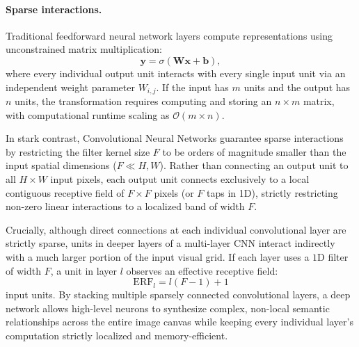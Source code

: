 \paragraph{Sparse interactions.}
Traditional feedforward neural network layers compute representations using unconstrained matrix multiplication:
\begin{equation}
\mathbf{y} = \sigma(\mathbf{W} \mathbf{x} + \mathbf{b}),
\end{equation}
where every individual output unit interacts with every single input unit via an independent weight parameter $W_{i, j}$. If the input has $m$ units and the output has $n$ units, the transformation requires computing and storing an $n \times m$ matrix, with computational runtime scaling as $\mathcal{O}(m \times n)$.

In stark contrast, Convolutional Neural Networks guarantee sparse interactions by restricting the filter kernel size $F$ to be orders of magnitude smaller than the input spatial dimensions ($F \ll H, W$). Rather than connecting an output unit to all $H \times W$ input pixels, each output unit connects exclusively to a local contiguous receptive field of $F \times F$ pixels (or $F$ taps in 1D), strictly restricting non-zero linear interactions to a localized band of width $F$.

Crucially, although direct connections at each individual convolutional layer are strictly sparse, units in deeper layers of a multi-layer CNN interact indirectly with a much larger portion of the input visual grid. If each layer uses a $1\text{D}$ filter of width $F$, a unit in layer $l$ observes an effective receptive field:
\begin{equation}
\text{ERF}_l = l(F - 1) + 1
\end{equation}
input units. By stacking multiple sparsely connected convolutional layers, a deep network allows high-level neurons to synthesize complex, non-local semantic relationships across the entire image canvas while keeping every individual layer's computation strictly localized and memory-efficient.

